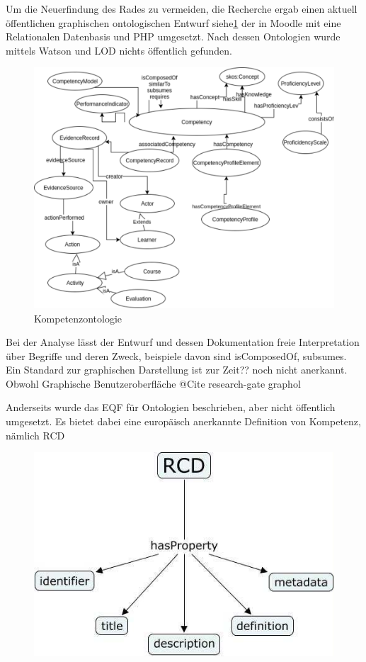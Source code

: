 \documentclass[
12pt,
english,
ngerman,
headsepline,
twoside,
openright,
numbers=noenddot,version=first
]{scrreprt}
\begin{document}
Um die Neuerfindung des Rades zu vermeiden, die Recherche ergab einen aktuell öffentlichen graphischen ontologischen Entwurf\cite{ontoMoodle} siehe\ref{fig:competence-ontology} der in Moodle mit eine Relationalen Datenbasis und PHP umgesetzt. Nach dessen Ontologien wurde mittels Watson\cite{Watson} und LOD\cite{LOD} nichts öffentlich gefunden. 


\begin{figure}[h]
	\centering
	\includegraphics[angle=270]{pics/competency-ontology.eps}
	\caption{Kompetenzontologie}
	\label{fig:competence-ontology}
\end{figure}

Bei der Analyse lässt der Entwurf und dessen Dokumentation freie Interpretation über Begriffe und deren Zweck, beispiele davon sind \glqq isComposedOf\grqq, \glqq subsumes\grqq. Ein Standard zur graphischen Darstellung ist zur Zeit?? noch nicht anerkannt. Obwohl Graphische Benutzeroberfläche  @Cite research-gate graphol

Anderseits wurde das \acrshort{EQF} für Ontologien beschrieben, aber nicht öffentlich umgesetzt. Es bietet dabei eine europäisch anerkannte Definition von Kompetenz, nämlich RCD\cite{eqfCompetency}


\begin{figure}
	\includegraphics[width=0.9\linewidth]{pics/RCD.jpg}
\end{figure}
\end{document}
